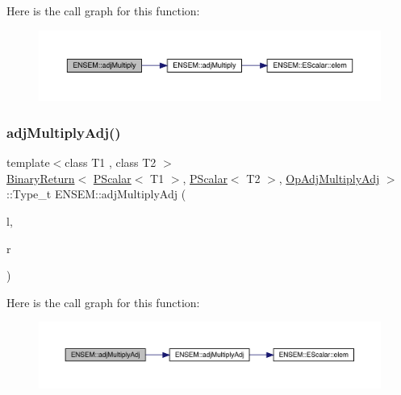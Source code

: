 Here is the call graph for this function\+:\nopagebreak
\begin{figure}[H]
\begin{center}
\leavevmode
\includegraphics[width=350pt]{db/dcc/group__primscalar_gacd01dab554ff851aa1ca0012ec9accf0_cgraph}
\end{center}
\end{figure}
\mbox{\label{group__primscalar_gaefec03134414f1f7c36b09b92cf9570b}} 
\subsubsection{\texorpdfstring{adjMultiplyAdj()}{adjMultiplyAdj()}}
{\footnotesize\ttfamily template$<$class T1 , class T2 $>$ \\
\mbox{\hyperlink{structENSEM_1_1BinaryReturn}{Binary\+Return}}$<$ \mbox{\hyperlink{classENSEM_1_1PScalar}{P\+Scalar}}$<$ T1 $>$, \mbox{\hyperlink{classENSEM_1_1PScalar}{P\+Scalar}}$<$ T2 $>$, \mbox{\hyperlink{structENSEM_1_1OpAdjMultiplyAdj}{Op\+Adj\+Multiply\+Adj}} $>$\+::Type\+\_\+t E\+N\+S\+E\+M\+::adj\+Multiply\+Adj (\begin{DoxyParamCaption}\item[{const \mbox{\hyperlink{classENSEM_1_1PScalar}{P\+Scalar}}$<$ T1 $>$ \&}]{l,  }\item[{const \mbox{\hyperlink{classENSEM_1_1PScalar}{P\+Scalar}}$<$ T2 $>$ \&}]{r }\end{DoxyParamCaption})\hspace{0.3cm}{\ttfamily [inline]}}

Here is the call graph for this function\+:\nopagebreak
\begin{figure}[H]
\begin{center}
\leavevmode
\includegraphics[width=350pt]{db/dcc/group__primscalar_gaefec03134414f1f7c36b09b92cf9570b_cgraph}
\end{center}
\end{figure}
\mbox{\label{group__primscalar_ga66e19f88731b0ca161e7ecb7a3d4ea94}} 
